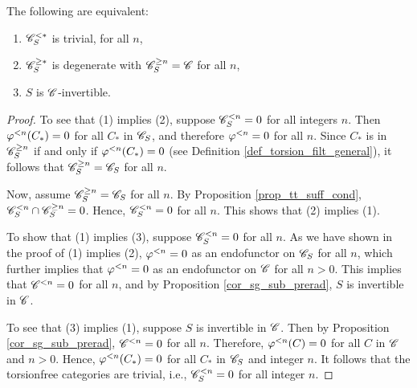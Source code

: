 \begin{prop}
The following are equivalent:

\begin{enumerate}

\item $\Corad{*}{\CatLoc{C}{S}}$ is trivial,
for all $n$,

\item $\Prerad{*}{\CatLoc{C}{S}}$ is degenerate with 
$\Prerad{n}{\CatLoc{C}{S}} = \Cat{C}$ for all $n$,

\item $S$ is $\Cat{C}$-invertible.
\end{enumerate}
\end{prop}
\begin{proof}
To see that (1) implies (2), suppose $\Corad{n}{\CatLoc{C}{S}} = 
0$ for all integers $n$. Then $\corad{n}(C_*) = 0$ for all $C_*$
in $\CatLoc{C}{S}$, and therefore $\corad{n} = 0$ for all $n$.
Since $C_*$ is in $\Prerad{n}{\CatLoc{C}{S}}$ if and only if
$\corad{n}(C_*) = 0$ (see Definition 
\ref{def_torsion_filt_general}), it follows that $\Prerad{n}{\CatLoc{C}{S}}
= \CatLoc{C}{S}$ for all $n$.

Now, assume $\Prerad{n}{\CatLoc{C}{S}} = \CatLoc{C}{S}$ for
all $n$. By Proposition \ref{prop_tt_suff_cond}, $\Corad{n}{\CatLoc{C}{S}}
\cap \Prerad{n}{\CatLoc{C}{S}} = 0$. Hence, $\Corad{n}{\CatLoc{C}{S}} = 0$
for all $n$. This shows that (2) implies (1).

To show that (1) implies (3), suppose $\Corad{n}{\CatLoc{C}{S}} = 0$
for all $n$. As we have shown in the proof of (1) implies (2), 
$\corad{n} = 0$ as an endofunctor on $\CatLoc{C}{S}$ for all $n$, 
which further implies that $\corad{n} = 0$ as an endofunctor on
$\Cat{C}$ for all $n > 0$. This implies that $\Corad{n}{\Cat{C}} = 0$
for all $n$, and by Proposition \ref{cor_sg_sub_prerad}, $S$ is
invertible in $\Cat{C}$.

To see that (3) implies (1), suppose $S$ is invertible in
$\Cat{C}$. Then by Proposition \ref{cor_sg_sub_prerad},
$\Corad{n}{\Cat{C}} = 0$ for all $n$. Therefore, $\corad{n}(C) = 0$
for all $C$ in $\Cat{C}$ and $n > 0$. Hence, $\corad{n}(C_*) = 0$
for all $C_*$ in $\CatLoc{C}{S}$ and integer $n$. It follows that
the torsionfree categories are trivial, i.e., 
$\Corad{n}{\CatLoc{C}{S}} = 0$ for all integer $n$.
\end{proof}

%
